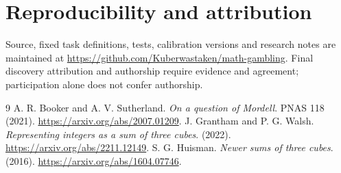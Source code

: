 \documentclass[11pt,a4paper]{article}
\begin{document}
\section{Reproducibility and attribution}
Source, fixed task definitions, tests, calibration versions and research notes are maintained at \url{https://github.com/Kuberwastaken/math-gambling}. Final discovery attribution and authorship require evidence and agreement; participation alone does not confer authorship.
\begin{thebibliography}{9}
 A. R. Booker and A. V. Sutherland. \emph{On a question of Mordell}. PNAS 118 (2021). \url{https://arxiv.org/abs/2007.01209}.
 J. Grantham and P. G. Walsh. \emph{Representing integers as a sum of three cubes}. (2022). \url{https://arxiv.org/abs/2211.12149}.
 S. G. Huisman. \emph{Newer sums of three cubes}. (2016). \url{https://arxiv.org/abs/1604.07746}.
\end{thebibliography}
\end{document}
